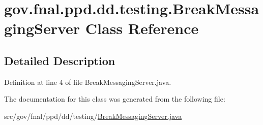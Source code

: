 \hypertarget{classgov_1_1fnal_1_1ppd_1_1dd_1_1testing_1_1BreakMessagingServer}{\section{gov.\-fnal.\-ppd.\-dd.\-testing.\-Break\-Messaging\-Server Class Reference}
\label{classgov_1_1fnal_1_1ppd_1_1dd_1_1testing_1_1BreakMessagingServer}
}


\subsection{Detailed Description}


Definition at line 4 of file Break\-Messaging\-Server.\-java.



The documentation for this class was generated from the following file\-:\begin{DoxyCompactItemize}
\item 
src/gov/fnal/ppd/dd/testing/\hyperlink{BreakMessagingServer_8java}{Break\-Messaging\-Server.\-java}\end{DoxyCompactItemize}
